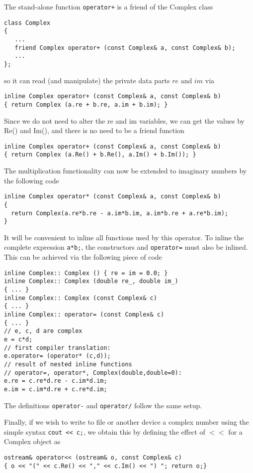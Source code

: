The stand-alone function \verb?operator+? is a friend of the Complex  class
\begin{lstlisting}
class Complex
{
   ...
   friend Complex operator+ (const Complex& a, const Complex& b);
   ...
};
\end{lstlisting}
so it can read (and manipulate) the private data parts $re$ and
$im$ via
\begin{lstlisting}
inline Complex operator+ (const Complex& a, const Complex& b)
{ return Complex (a.re + b.re, a.im + b.im); }
\end{lstlisting}
Since we do not need to alter the re and im variables, we can
get the values by Re() and Im(), and there is no need to be a
friend function
\begin{lstlisting}
inline Complex operator+ (const Complex& a, const Complex& b)
{ return Complex (a.Re() + b.Re(), a.Im() + b.Im()); }
\end{lstlisting}

The multiplication functionality can now be extended to imaginary numbers by the following code
\begin{lstlisting}
inline Complex operator* (const Complex& a, const Complex& b)
{
  return Complex(a.re*b.re - a.im*b.im, a.im*b.re + a.re*b.im);
}
\end{lstlisting}
It will be convenient to inline all functions used by this operator.
To inline the complete expression \verb?a*b;?, the constructors and
\verb?operator=?  must also be inlined.  This can be achieved via the following piece of code
\begin{lstlisting}
inline Complex:: Complex () { re = im = 0.0; }
inline Complex:: Complex (double re_, double im_)
{ ... }
inline Complex:: Complex (const Complex& c)
{ ... }
inline Complex:: operator= (const Complex& c)
{ ... }
// e, c, d are complex
e = c*d;
// first compiler translation:
e.operator= (operator* (c,d));
// result of nested inline functions
// operator=, operator*, Complex(double,double=0):
e.re = c.re*d.re - c.im*d.im;
e.im = c.im*d.re + c.re*d.im;
\end{lstlisting}
The definitions \verb?operator-? and \verb?operator/? follow the same setup.


Finally, if we wish to write to file or another device a complex number using the simple syntax
\verb?cout << c;?, we obtain this by defining
the effect of $<<$ for a Complex object as 
\begin{lstlisting}
ostream& operator<< (ostream& o, const Complex& c)
{ o << "(" << c.Re() << "," << c.Im() << ") "; return o;}
\end{lstlisting}

